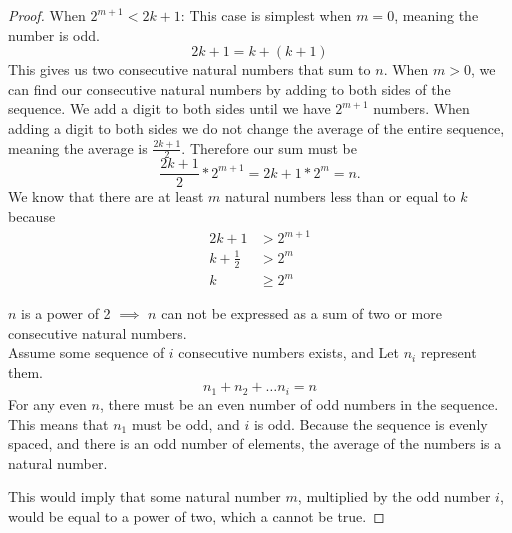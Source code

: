 \documentclass[12pt,a4paper,reqno,parskip=full]{amsart}
\numberwithin{equation}{section}
\theoremstyle{plain}
\theoremstyle{definition}
\renewcommand{\geq}{\geqslant}
\begin{document}
\begin{enumerate}
\begin{proof}
          When $2^{m + 1} < 2k + 1$:
          This case is simplest when $m = 0$, meaning the number is odd.
          \[2k + 1 = k + (k + 1)\]
          This gives us two consecutive natural numbers that sum to $n$. When $m > 0$, we can find
          our consecutive natural numbers by adding to both sides of the sequence. We add a digit to
          both sides until we have $2^{m+1}$ numbers. When adding a digit to both sides we do not
          change the average of the entire sequence, meaning the average is
          $\displaystyle\frac{2k + 1}{2}$.
          Therefore our sum must be
          \[\frac{2k + 1}{2} * 2^{m+1} = {2k + 1} * 2^m = n.\]
          We know that there are at least $m$ natural numbers less than or equal to $k$ because
          \begin{align*}
            2k + 1          & > 2^{m+1} \\
            k + \frac{1}{2} & > 2^m     \\
            k               & \geq 2^m
          \end{align*}

          $n$ is a power of 2 $\implies$
          $n$ can not be expressed as a sum of two or more consecutive natural numbers. \\
          Assume some sequence of $i$ consecutive numbers exists, and Let $n_i$ represent them.
          \[n_1 + n_2 +\dots n_i = n\]
          For any even $n$, there must be an even number of odd numbers in the sequence. This
          means that $n_1$ must be odd, and $i$ is odd. Because the sequence is evenly spaced, and 
          there is an odd number of elements, the average of the numbers is a natural number.

          This would imply that some natural number $m$, multiplied by the odd number $i$, would
          be equal to a power of two, which a cannot be true. 
        \end{proof}
\end{enumerate}
\end{document}

